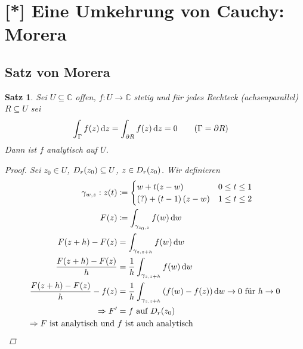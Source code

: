 \documentclass[11pt, a4paper]{article}
\theoremstyle{plain}
\newtheorem{satz}[blockelement]{Satz}
\numberwithin{equation}{subsection}
\newcommand{\pair}[1]{\left(#1\right)}
\newcommand{\of}[1]{\mathopen{}\mathclose{}\bgroup\left(#1\aftergroup\egroup\right)}
\newcommand{\impl}[0]{\Rightarrow{}}
\newcommand{\dif}{\mathop{}\!\mathrm{d}}
\let\Re\relax
\let\Im\relax
\DeclareMathOperator{\Re}{Re}
\DeclareMathOperator{\Im}{Im}
\newcommand{\C}{\mathbb{C}}
\begin{document}
    \newpage


    \section{[*] Eine Umkehrung von Cauchy: Morera}

    \subsection{Satz von Morera}
    \thispagestyle{sectionpage}

    \begin{satz} %
        \label{satz:morera}
        Sei $U\subseteq\C$ offen, $f: U\to\C$ stetig und für jedes Rechteck (achsenparallel) $R\subseteq U$ sei
        \begin{align*}
            \int_{\Gamma}^{} f\of{z} \dif z &= \int_{\partial R}^{} f\of{z} \dif z = 0\tag{$\Gamma = \partial R$}
        \end{align*}
        Dann ist $f$ analytisch auf $U$.

        \begin{proof}
            Sei $z_0\in U$, $D_r\of{z_0}\subseteq U$, $z\in D_r\of{z_0}$. Wir definieren
            \begin{align*}
                \gamma_{w,z}: z\of{t} &\coloneqq \begin{cases}
                                                     w + t\Re\of{z-w} &0\leq t \leq 1\\
                                                     \Re\of{?} + \pair{t-1}\Im\of{z-w} &1\leq t \leq 2
                \end{cases}\\
                F\of{z} &\coloneqq \int_{\gamma_{z_0, z}}^{} f\of{w} \dif w\\
                F\of{z+h} - F\of{z} &= \int_{\gamma_{z, z+h}}^{} f\of{w} \dif w\\
                \frac{F\of{z+h} - F\of{z}}{h} &= \frac{1}{h}\int_{\gamma_{z, z+h}}^{} f\of{w} \dif w\\
                \frac{F\of{z+h} - F\of{z}}{h} - f\of{z} &= \frac{1}{h} \int_{\gamma_{z, z+h}}^{} \pair{f\of{w} - f\of{z}} \dif w\to 0\text{ für } h\to 0\\
                \impl F' &= f\text{ auf } D_r\of{z_0}\\
                \impl F\text{ ist analytisch und } &f\text{ ist auch analytisch}\qedhere
            \end{align*}
        \end{proof}
    \end{satz}
\end{document}

